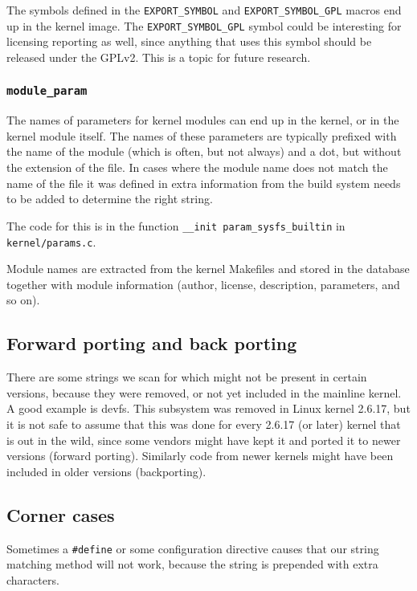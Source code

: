 \documentclass[10pt,a4paper]{article}
\begin{document}
The symbols defined in the \texttt{EXPORT\_SYMBOL} and
\texttt{EXPORT\_SYMBOL\_GPL} macros end up in the kernel image. The
\texttt{EXPORT\_SYMBOL\_GPL} symbol could be interesting for licensing
reporting as well, since anything that uses this symbol should be released
under the GPLv2. This is a topic for future research.

\subsubsection{\texttt{module\_param}}

The names of parameters for kernel modules can end up in the kernel, or in the
kernel module itself. The names of these parameters are typically prefixed
with the name of the module (which is often, but not always) and a dot, but
without the extension of the file. In cases where the module name does not
match the name of the file it was defined in extra information from the
build system needs to be added to determine the right string.

The code for this is in the function \texttt{\_\_init param\_sysfs\_builtin} in
\texttt{kernel/params.c}.

Module names are extracted from the kernel Makefiles and stored in the database
together with module information (author, license, description, parameters,
and so on).

\subsection{Forward porting and back porting}

There are some strings we scan for which might not be present in certain
versions, because they were removed, or not yet included in the mainline
kernel. A good example is devfs. This subsystem was removed in Linux kernel
2.6.17, but it is not safe to assume that this was done for every 2.6.17 (or
later) kernel that is out in the wild, since some vendors might have kept it
and ported it to newer versions (forward porting). Similarly code from newer
kernels might have been included in older versions
(backporting).

\subsection{Corner cases}

Sometimes a \texttt{\#define} or some configuration directive causes that our 
string matching method will not work, because the string is prepended with
extra characters.
\end{document}
